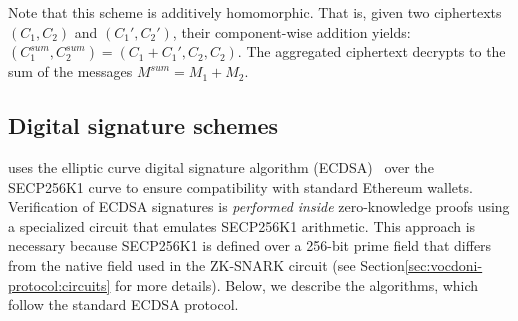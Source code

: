 Note that this scheme is additively homomorphic. That is, given two ciphertexts $(C_1, C_2)$ and $(C_1', C_2')$, their component-wise addition yields: $(C_1^{sum}, C_2^{sum}) = (C_1 + C_1', C_2, C_2)$. The aggregated ciphertext decrypts to the sum of the messages $M^{sum} = M_1 + M_2$.



\subsection{Digital signature schemes}
\label{sec:cryptographic-primitives:signatures}

\Davinci uses the elliptic curve digital signature algorithm (ECDSA)~\cite{johnson01ecdsa} over the SECP256K1 curve to ensure compatibility with standard Ethereum wallets. %
%
%
Verification of ECDSA signatures is \textit{performed inside} zero-knowledge proofs using a specialized circuit that emulates SECP256K1 arithmetic. This approach is necessary because SECP256K1 is defined over a 256-bit prime field that differs from the native field used in the ZK-SNARK circuit (see Section\ref{sec:vocdoni-protocol:circuits} for more details). Below, we describe the algorithms, which follow the standard ECDSA protocol.

